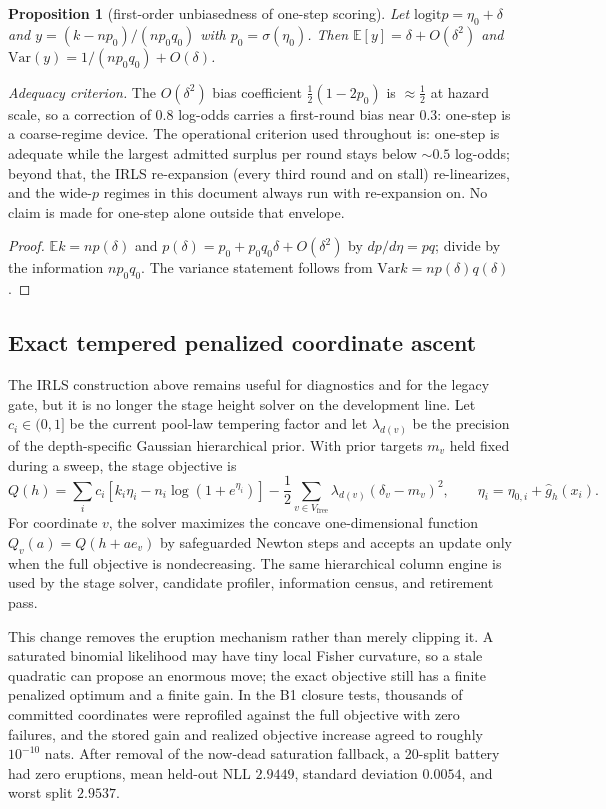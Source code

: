 \documentclass[11pt]{article}
\newtheorem{proposition}{Proposition}[section]
\newcommand{\E}{\mathbb{E}}
\newcommand{\Var}{\mathrm{Var}}
\newcommand{\logit}{\mathrm{logit}}
\begin{document}
\begin{proposition}[first-order unbiasedness of one-step scoring]\label{prop:onestep}
Let $\logit p=\eta_0+\delta$ and $y=(k-np_0)/(np_0q_0)$ with $p_0=\sigma(\eta_0)$. Then
$\E[y]=\delta+O(\delta^2)$ and $\Var(y)=1/(np_0q_0)+O(\delta)$.
\end{proposition}

\emph{Adequacy criterion.} The $O(\delta^2)$ bias coefficient
$\tfrac12(1-2p_0)$ is $\approx\tfrac12$ at hazard scale, so a correction of
$0.8$ log-odds carries a first-round bias near $0.3$: one-step is a
coarse-regime device. The operational criterion used throughout is: one-step
is adequate while the largest admitted surplus per round stays below
$\sim0.5$ log-odds; beyond that, the IRLS re-expansion (every third round and
on stall) re-linearizes, and the wide-$p$ regimes in this document always run
with re-expansion on. No claim is made for one-step alone outside that
envelope.
\begin{proof}
$\E k=np(\delta)$ and $p(\delta)=p_0+p_0q_0\delta+O(\delta^2)$ by
$dp/d\eta=pq$; divide by the information $np_0q_0$. The variance statement follows from
$\Var k=np(\delta)q(\delta)$.
\end{proof}

\subsection{Exact tempered penalized coordinate ascent}\label{sec:exactsolver}
The IRLS construction above remains useful for diagnostics and for the legacy gate, but it is no
longer the stage height solver on the development line. Let $c_i\in(0,1]$ be the current
pool-law tempering factor and let $\lambda_{d(v)}$ be the precision of the depth-specific Gaussian
hierarchical prior. With prior targets $m_v$ held fixed during a sweep, the stage objective is
\begin{equation}\label{eq:exact-objective}
Q(h)=\sum_i c_i\left[k_i\eta_i-n_i\log(1+e^{\eta_i})\right]
-\frac12\sum_{v\in V_{\mathrm{free}}}\lambda_{d(v)}(\delta_v-m_v)^2,
\qquad
\eta_i=\eta_{0,i}+\hat g_h(x_i).
\end{equation}
For coordinate $v$, the solver maximizes the concave one-dimensional function
$Q_v(a)=Q(h+a e_v)$ by safeguarded Newton steps and accepts an update only when the full objective
is nondecreasing. The same hierarchical column engine is used by the stage solver, candidate
profiler, information census, and retirement pass.

This change removes the eruption mechanism rather than merely clipping it. A saturated binomial
likelihood may have tiny local Fisher curvature, so a stale quadratic can propose an enormous move;
the exact objective still has a finite penalized optimum and a finite gain. In the B1 closure tests,
thousands of committed coordinates were reprofiled against the full objective with zero failures,
and the stored gain and realized objective increase agreed to roughly $10^{-10}$ nats. After removal
of the now-dead saturation fallback, a 20-split battery had zero eruptions, mean held-out NLL
$2.9449$, standard deviation $0.0054$, and worst split $2.9537$.
\end{document}
